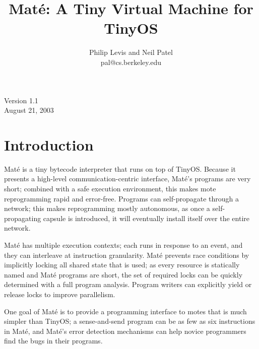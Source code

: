 \documentclass[10pt]{article}
\title{Mat\'{e}: A Tiny Virtual Machine for TinyOS}
\author{Philip Levis and Neil Patel\\pal@cs.berkeley.edu}
\date{}
\newcommand{\mate}{Mat\'{e}\xspace}
\begin{document}

\maketitle
\vspace{2in}
\begin{center}
Version 1.1\\
August 21, 2003
\end{center}

\fontsize{10}{10}                               %


\thispagestyle{empty}
\newpage
\tableofcontents
\newpage

\section{Introduction}

\mate is a tiny bytecode interpreter that runs on top of
TinyOS. Because it presents a high-level communication-centric
interface, \mate's programs are very short; combined with a safe
execution environment, this makes mote reprogramming rapid and
error-free. Programs can self-propagate through a network; this makes
reprogramming mostly autonomous, as once a self-propagating capsule is
introduced, it will eventually install itself over the entire network.


\mate has multiple execution contexts; each runs in response to an
event, and they can interleave at instruction granularity. \mate
prevents race conditions by implicitly locking all shared state that
is used; as every resource is statically named and \mate programs
are short, the set of required locks can be quickly determined with a
full program analysis. Program writers can explicitly yield or release
locks to improve parallelism.


One goal of \mate is to provide a programming interface to motes
that is much simpler than TinyOS; a sense-and-send program can be as
few as six instructions in \mate, and \mate's error detection
mechanisms can help novice programmers find the bugs in their
programs.
\end{document}

